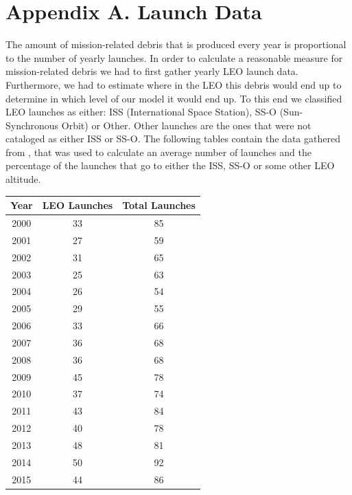 \documentclass{article}
\theoremstyle{definition}
\begin{document}
\begin{enumerat}
\begin{itemize}
\end{itemize}

\section*{Appendix A. Launch Data}
The amount of mission-related debris that is produced every year is proportional to the number of yearly launches. In order to calculate a reasonable measure for mission-related debris we had to first gather yearly LEO launch data. Furthermore, we had to estimate where in the LEO this debris would end up to determine in which level of our model it would end up. To this end we classified LEO launches as either: ISS (International Space Station), SS-O (Sun-Synchronous Orbit) or Other. Other launches are the ones that were not cataloged as either ISS or SS-O. The following tables contain the data gathered from \cite{spaceLaunchReport}, that was used to calculate an average number of launches and the percentage of the launches that go to either the ISS, SS-O or some other LEO altitude.
\begin{table}
\centering
    \begin{tabular}{| c | c | c |}   
    \hline
    \textbf{Year} & \textbf{LEO Launches} & \textbf{Total Launches} \\ \hline
    2000 & 33 & 85 \\ \hline
    2001 & 27 & 59 \\ \hline
    2002 & 31 & 65 \\ \hline
    2003 & 25 & 63 \\ \hline
    2004 & 26 & 54 \\ \hline
    2005 & 29 & 55 \\ \hline
    2006 & 33 & 66 \\ \hline
    2007 & 36 & 68 \\ \hline
    2008 & 36 & 68 \\ \hline 
    2009 & 45 & 78 \\ \hline
    2010 & 37 & 74 \\ \hline
    2011 & 43 & 84 \\ \hline
    2012 & 40 & 78 \\ \hline
    2013 & 48 & 81 \\ \hline
    2014 & 50 & 92 \\ \hline
    2015 & 44 & 86 \\ \hline
    \end{tabular}

\end{table}
\end{enumerat}
\end{document}
